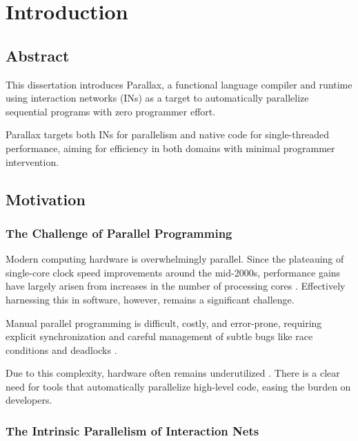 \chapter{Introduction}\label{chap:introduction}

\section{Abstract}

This dissertation introduces Parallax, a functional language compiler and runtime using interaction networks (INs) as a target to automatically parallelize sequential programs with zero programmer effort.

Parallax targets both INs for parallelism and native code for single-threaded performance, aiming for efficiency in both domains with minimal programmer intervention.

\section{Motivation}
\subsection{The Challenge of Parallel Programming}

Modern computing hardware is overwhelmingly parallel. Since the plateauing of single-core clock speed improvements around the mid-2000s, performance gains have largely arisen from increases in the number of processing cores \cite{Asanovic2006TheLandscape}. Effectively harnessing this in software, however, remains a significant challenge.

Manual parallel programming is difficult, costly, and error-prone, requiring explicit synchronization and careful management of subtle bugs like race conditions and deadlocks \cite{Lee2006TheProblem}.

Due to this complexity, hardware often remains underutilized \cite{Berzal2013}. There is a clear need for tools that automatically parallelize high-level code, easing the burden on developers.

\subsection{The Intrinsic Parallelism of Interaction Nets}

